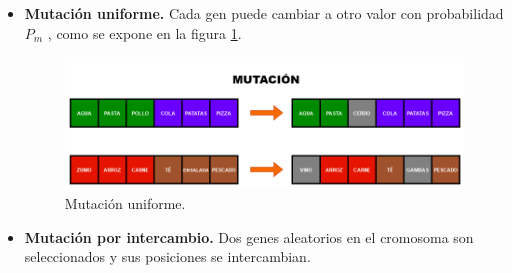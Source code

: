 \begin{itemize}
  \item \textbf{Mutación uniforme.} Cada gen puede cambiar a otro valor con probabilidad \(P_m\) , como se expone en la figura \ref{fig:mutación}.

  \begin{figure}[H]
    \centering
    \includegraphics[width=1\textwidth]{figures/mutacion.png}
    \caption{Mutación uniforme.}
    \label{fig:mutación}
  \end{figure}

  \item \textbf{Mutación por intercambio.} Dos genes aleatorios en el cromosoma son seleccionados y sus posiciones se intercambian. 
\end{itemize}

